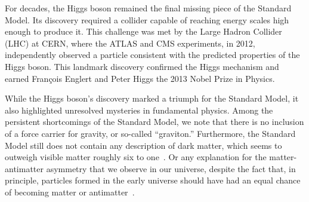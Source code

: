 















For decades, the Higgs boson remained the final missing piece of the Standard Model. Its discovery required a collider capable of reaching energy scales high enough to produce it. This challenge was met by the Large Hadron Collider (LHC) at CERN, where the ATLAS and CMS experiments, in 2012, independently observed a particle consistent with the predicted properties of the Higgs boson. This landmark discovery confirmed the Higgs mechanism and earned François Englert and Peter Higgs the 2013 Nobel Prize in Physics.

While the Higgs boson’s discovery marked a triumph for the Standard Model, it also highlighted unresolved mysteries in fundamental physics. Among the persistent shortcomings of the Standard Model, we note that there is no inclusion of a force carrier for gravity, or so-called ``graviton.'' Furthermore, the Standard Model still does not contain any description of dark matter, which seems to outweigh visible matter roughly six to one~\cite{Darkmatt18}. Or any explanation for the matter-antimatter asymmetry that we observe in our universe, despite the fact that, in principle, particles formed in the early universe should have had an equal chance of becoming matter or antimatter~\cite{Thematte44}.

